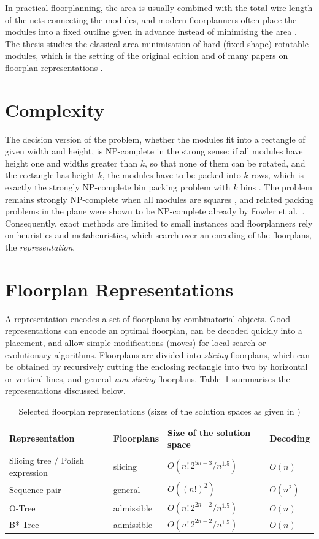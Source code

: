 In practical floorplanning, the area is usually combined with the total wire length of the nets connecting the modules, and modern floorplanners often place the modules into a fixed outline given in advance instead of minimising the area \cite{adya}. The thesis studies the classical area minimisation of hard (fixed-shape) rotatable modules, which is the setting of the original edition and of many papers on floorplan representations \cite{btree,otree,sp}.

\section{Complexity}

The decision version of the problem, whether the modules fit into a rectangle of given width and height, is NP-complete in the strong sense: if all modules have height one and widths greater than $k$, so that none of them can be rotated, and the rectangle has height $k$, the modules have to be packed into $k$ rows, which is exactly the strongly NP-complete bin packing problem with $k$ bins \cite{garey}. The problem remains strongly NP-complete when all modules are squares \cite{leung}, and related packing problems in the plane were shown to be NP-complete already by Fowler et al.~\cite{fowler}. Consequently, exact methods are limited to small instances and floorplanners rely on heuristics and metaheuristics, which search over an encoding of the floorplans, the {\em representation}.

\section{Floorplan Representations}

A representation encodes a set of floorplans by combinatorial objects. Good representations can encode an optimal floorplan, can be decoded quickly into a placement, and allow simple modifications (moves) for local search or evolutionary algorithms. Floorplans are divided into {\em slicing} floorplans, which can be obtained by recursively cutting the enclosing rectangle into two by horizontal or vertical lines, and general {\em non-slicing} floorplans. Table~\ref{tab:representations} summarises the representations discussed below.

\begin{table}
\centering
\begin{tabular}{@{}llll@{}}
\toprule
Representation & Floorplans & Size of the solution space & Decoding \\
\midrule
Slicing tree / Polish expression \cite{pe} & slicing & $O(n! \, 2^{5n-3} / n^{1.5})$ & $O(n)$ \\
Sequence pair \cite{sp} & general & $O((n!)^2)$ & $O(n^2)$ \\
O-Tree \cite{otree} & admissible & $O(n! \, 2^{2n-2} / n^{1.5})$ & $O(n)$ \\
B*-Tree \cite{btree} & admissible & $O(n! \, 2^{2n-2} / n^{1.5})$ & $O(n)$ \\
\bottomrule
\end{tabular}
\caption{Selected floorplan representations (sizes of the solution spaces as given in \cite{otree})}
\label{tab:representations}
\end{table}

